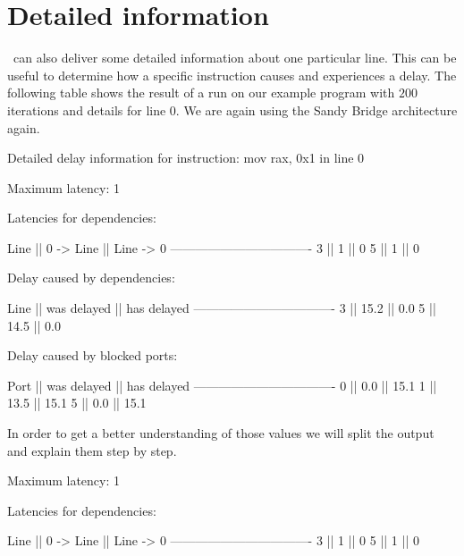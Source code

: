 \section{Detailed information}
\label{sec:detail}

\suaca\ can also deliver some detailed information about one particular line. This can be useful to determine how a specific instruction causes and experiences a delay. The following table shows the result of a run on our example program with $200$ iterations and details for line $0$. We are again using the Sandy Bridge architecture again.

\begin{Example}
Detailed delay information for instruction: mov rax, 0x1 in line 0

                Maximum latency: 1
                
                Latencies for dependencies:
                
                Line || 0 -> Line || Line -> 0
                ----------------------------------
                 3   ||     1     ||     0
                 5   ||     1     ||     0
                
                
                Delay caused by dependencies:
                
                Line || was delayed || has delayed
                ----------------------------------
                 3   ||    15.2     ||     0.0
                 5   ||    14.5     ||     0.0
                
                
                Delay caused by blocked ports:
                
                Port || was delayed || has delayed
                ----------------------------------
                 0   ||     0.0     ||    15.1
                 1   ||    13.5     ||    15.1
                 5   ||     0.0     ||    15.1
\end{Example}

In order to get a better understanding of those values we will split the output and explain them step by step.

\begin{Example}
Maximum latency: 1

Latencies for dependencies:

Line || 0 -> Line || Line -> 0
----------------------------------
 3   ||     1     ||     0
 5   ||     1     ||     0
\end{Example}

